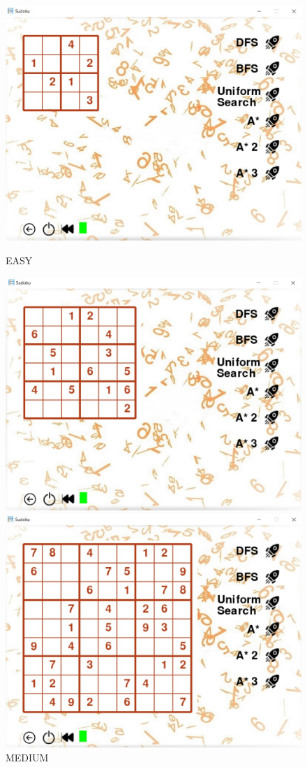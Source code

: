 \documentclass[a4paper,18pt]{article}
\begin{document}
\begin{figure}[!htb]
  \includegraphics[width=\linewidth]{4.jpg}
  \caption{EASY}\label{fig: EASY}
\endminipage\hfill
{}
  \includegraphics[width=\linewidth]{5.jpg}
  \caption{MEDIUM }\label{fig: MEDIUM}
\endminipage\hfill
{}%
  \includegraphics[width=\linewidth]{6.jpg}

\end{figure}
\end{document}
